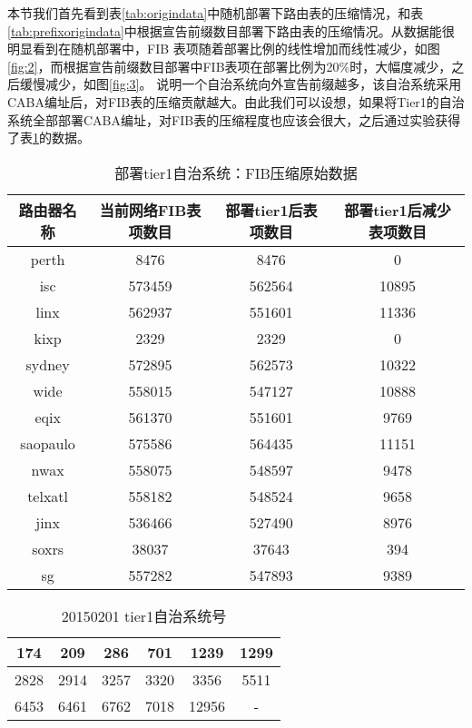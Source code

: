 本节我们首先看到表\ref{tab:origindata}中随机部署下路由表的压缩情况，和表\ref{tab:prefixorigindata}中根据宣告前缀数目部署下路由表的压缩情况。从数据能很明显看到在随机部署中，FIB 表项随着部署比例的线性增加而线性减少，如图\ref{fig:2}，而根据宣告前缀数目部署中FIB表项在部署比例为20\%时，大幅度减少，之后缓慢减少，如图\ref{fig:3}。 说明一个自治系统向外宣告前缀越多，该自治系统采用CABA编址后，对FIB表的压缩贡献越大。由此我们可以设想，如果将Tier1的自治系统全部部署CABA编址，对FIB表的压缩程度也应该会很大，之后通过实验获得了表\ref{tab:tieronefibdata}的数据。

\begin{table}[h]
    \centering
    \caption{部署tier1自治系统：FIB压缩原始数据}
    \label{tab:tieronefibdata}
    \begin{tabular}{|c|c|c|c|}
    \hline
            路由器名称 & 当前网络FIB表项数目 & 部署tier1后表项数目 & 部署tier1后减少表项数目\\ \hline
            perth    & 8476   & 8476   & 0  \\ \hline
            isc      & 573459 & 562564 & 10895   \\ \hline
            linx     & 562937 & 551601  & 11336   \\ \hline
            kixp     & 2329   & 2329   & 0        \\ \hline
            sydney   & 572895 & 562573 & 10322      \\ \hline
            wide     & 558015 & 547127 &  10888         \\ \hline
            eqix     & 561370 & 551601 & 9769        \\ \hline
            saopaulo & 575586 & 564435 & 11151       \\ \hline
            nwax     & 558075 & 548597  &     9478     \\ \hline
            telxatl  & 558182 & 548524   &  9658      \\ \hline
            jinx     & 536466 & 527490    &     8976    \\ \hline
            soxrs    & 38037  & 37643      &  394   \\ \hline
            sg       & 557282 & 547893    & 9389\\ \hline
    \end{tabular}
\end{table}

\begin{table}
    \centering
    \caption{20150201 tier1自治系统号}
    \label{tab:tier1asn}
    \begin{tabular}{|c|c|c|c|c|c|}
    \hline
    174 & 209 & 286 & 701 & 1239 & 1299 \\ \hline
    2828 & 2914 & 3257 & 3320 & 3356 & 5511 \\ \hline
    6453 & 6461 & 6762 & 7018 & 12956 & - \\ \hline
    \end{tabular}
\end{table}

